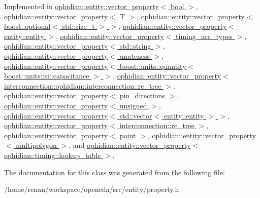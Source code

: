 Implemented in \hyperlink{classophidian_1_1entity_1_1vector__property_3_01bool_01_4_a3d61196d880589d68bf68d81c3310643}{ophidian\-::entity\-::vector\-\_\-property$<$ bool $>$}, \hyperlink{classophidian_1_1entity_1_1vector__property_a6b239378e987a33fd05c69bd57158bdc}{ophidian\-::entity\-::vector\-\_\-property$<$ T $>$}, \hyperlink{classophidian_1_1entity_1_1vector__property_a6b239378e987a33fd05c69bd57158bdc}{ophidian\-::entity\-::vector\-\_\-property$<$ boost\-::optional$<$ std\-::size\-\_\-t $>$ $>$}, \hyperlink{classophidian_1_1entity_1_1vector__property_a6b239378e987a33fd05c69bd57158bdc}{ophidian\-::entity\-::vector\-\_\-property$<$ entity\-::entity $>$}, \hyperlink{classophidian_1_1entity_1_1vector__property_a6b239378e987a33fd05c69bd57158bdc}{ophidian\-::entity\-::vector\-\_\-property$<$ timing\-\_\-arc\-\_\-types $>$}, \hyperlink{classophidian_1_1entity_1_1vector__property_a6b239378e987a33fd05c69bd57158bdc}{ophidian\-::entity\-::vector\-\_\-property$<$ std\-::string $>$}, \hyperlink{classophidian_1_1entity_1_1vector__property_a6b239378e987a33fd05c69bd57158bdc}{ophidian\-::entity\-::vector\-\_\-property$<$ unateness $>$}, \hyperlink{classophidian_1_1entity_1_1vector__property_a6b239378e987a33fd05c69bd57158bdc}{ophidian\-::entity\-::vector\-\_\-property$<$ boost\-::units\-::quantity$<$ boost\-::units\-::si\-::capacitance $>$ $>$}, \hyperlink{classophidian_1_1entity_1_1vector__property_a6b239378e987a33fd05c69bd57158bdc}{ophidian\-::entity\-::vector\-\_\-property$<$ interconnection\-::ophidian\-::interconnection\-::rc\-\_\-tree $>$}, \hyperlink{classophidian_1_1entity_1_1vector__property_a6b239378e987a33fd05c69bd57158bdc}{ophidian\-::entity\-::vector\-\_\-property$<$ pin\-\_\-directions $>$}, \hyperlink{classophidian_1_1entity_1_1vector__property_a6b239378e987a33fd05c69bd57158bdc}{ophidian\-::entity\-::vector\-\_\-property$<$ unsigned $>$}, \hyperlink{classophidian_1_1entity_1_1vector__property_a6b239378e987a33fd05c69bd57158bdc}{ophidian\-::entity\-::vector\-\_\-property$<$ std\-::vector$<$ entity\-::entity $>$ $>$}, \hyperlink{classophidian_1_1entity_1_1vector__property_a6b239378e987a33fd05c69bd57158bdc}{ophidian\-::entity\-::vector\-\_\-property$<$ interconnection\-::rc\-\_\-tree $>$}, \hyperlink{classophidian_1_1entity_1_1vector__property_a6b239378e987a33fd05c69bd57158bdc}{ophidian\-::entity\-::vector\-\_\-property$<$ point $>$}, \hyperlink{classophidian_1_1entity_1_1vector__property_a6b239378e987a33fd05c69bd57158bdc}{ophidian\-::entity\-::vector\-\_\-property$<$ multipolygon $>$}, and \hyperlink{classophidian_1_1entity_1_1vector__property_a6b239378e987a33fd05c69bd57158bdc}{ophidian\-::entity\-::vector\-\_\-property$<$ ophidian\-::timing\-::lookup\-\_\-table $>$}.



The documentation for this class was generated from the following file\-:\begin{DoxyCompactItemize}
\item 
/home/renan/workspace/openeda/src/entity/property.\-h\end{DoxyCompactItemize}
